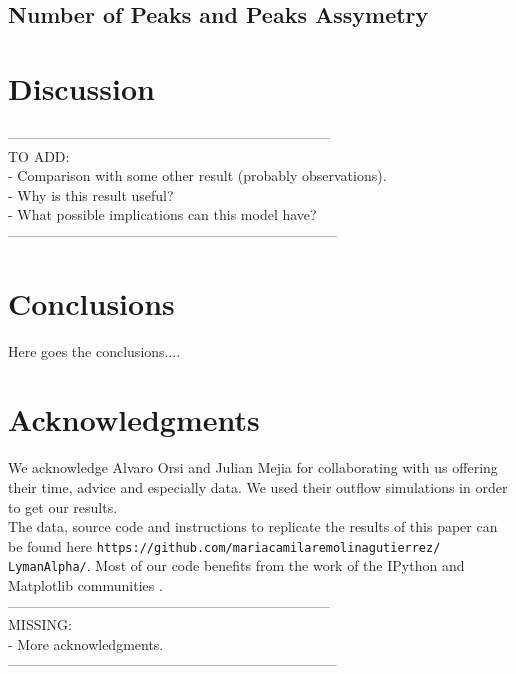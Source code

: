 \documentclass{latex/emulateapj}
\begin{document}
\subsection{Number of Peaks and Peaks Assymetry}


\section{Discussion}
\label{sec:discussion}

---------------------------------------------------------------------\\
TO ADD: \\
- Comparison with some other result (probably observations).\\
- Why is this result useful? \\
- What possible implications can this model have?\\
-----------------------------------------------------------------------\\

\section{Conclusions}
\label{sec:conclusions}
Here goes the conclusions....

\section*{Acknowledgments}

We acknowledge Alvaro Orsi and Julian Mejia for collaborating with us offering their time, advice and especially data. We used their outflow simulations in order to get our results.\\

The data, source code and instructions to replicate the results of this paper can be found here {\texttt{https://github.com/mariacamilaremolinagutierrez/ LymanAlpha/}}.
Most of our code benefits from the work of the IPython and Matplotlib communities \citep{IPython,matplotlib}.\\

---------------------------------------------------------------------\\
MISSING: \\
- More acknowledgments.\\
-----------------------------------------------------------------------\\

\end{document}

